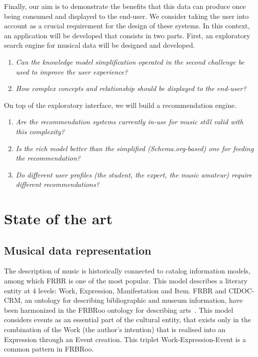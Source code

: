\documentclass{llncs}
\begin{document}
Finally, our aim is to demonstrate the benefits that this data can produce once being consumed and displayed to the end-user. We consider taking the user into account as a crucial requirement for the design of these systems. In this context, an application will be developed that consists in two parts. First, an exploratory search engine for musical data will be designed and developed.
\begin{enumerate}
 \item \textit{Can the knowledge model simplification operated in the second challenge be used to improve the user experience?} 
 \item \textit{How complex concepts and relationship should be displayed to the end-user?}
\end{enumerate}
On top of the exploratory interface, we will build a recommendation engine.
\begin{enumerate}
 \item \textit{Are the recommendation systems currently in-use for music still valid with this complexity?}
 \item \textit{Is the rich model better than the simplified (Schema.org-based) one for feeding the recommendation?}
 \item \textit{Do different user profiles (the student, the expert, the music amateur) require different recommendations?}
\end{enumerate}


\section{State of the art}
\label{sec:state-art}

\subsection{Musical data representation}
The description of music is historically connected to catalog information models, among which FRBR is one of the most popular. This model describes a literary entity at 4 levels: Work, Expression, Manifestation and Item. FRBR and CIDOC-CRM, an ontology for describing bibliographic and museum information, have been harmonized in the FRBRoo ontology for describing arts~\cite{doerr2008frbroo}. This model considers events as an essential part of the cultural entity, that exists only in the combination of the Work (the author's intention) that is realised into an Expression through an Event creation. This triplet Work-Expression-Event is a common pattern in FRBRoo.
\end{document}
